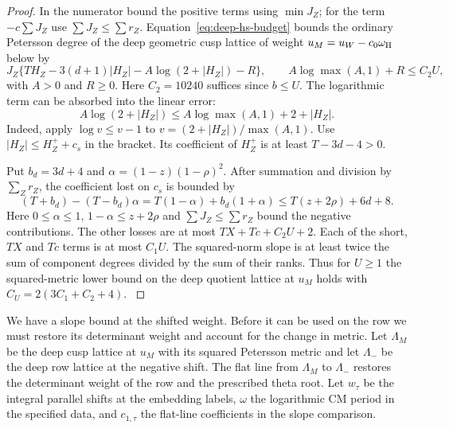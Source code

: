 \begin{proof}
In the numerator
bound the positive terms using \(\min J_Z\); for the term
\(-c\sum J_Z\) use \(\sum J_Z\le\sum r_Z\).
Equation~\eqref{eq:deep-hs-budget} bounds the ordinary
Petersson degree of the deep geometric cusp lattice of
weight \(u_M=u_W-c_0\omega_{\rm H}\) below by
\[
 J_Z\{T H_Z-3(d+1)|H_Z|-A\log(2+|H_Z|)-R\},
 \qquad A\log\max(A,1)+R\le C_2 U ,
\]
with \(A>0\) and \(R\ge0\).
Here \(C_2=10240\) suffices since \(b\le U\).
The logarithmic term can be absorbed into the linear error:
\[
 A\log(2+|H_Z|)\le A\log\max(A,1)+2+|H_Z| .
\]
Indeed, apply \(\log v\le v-1\) to \(v=(2+|H_Z|)/\max(A,1)\).
Use \(|H_Z|\le H_Z^++c_s\) in the bracket. Its coefficient
of \(H_Z^+\) is at least \(T-3d-4>0\).

Put \(b_d=3d+4\) and \(\alpha=(1-z)(1-\rho)^2\).
After summation and division by \(\sum_Z r_Z\), the coefficient
lost on \(c_s\) is bounded by
\[
 (T+b_d)-(T-b_d)\alpha
      = T(1-\alpha)+b_d(1+\alpha)
      \le T(z+2\rho)+6d+8 .
\]
Here \(0\le\alpha\le1\), \(1-\alpha\le z+2\rho\) and
\(\sum J_Z\le\sum r_Z\) bound the negative contributions.
The other losses are at most \(TX+Tc+C_2U+2\).
Each of the short, \(TX\) and \(Tc\) terms is at most
\(C_1U\). The squared-norm slope is at least twice the sum
of component degrees divided by the sum of their ranks.
Thus for \(U\ge1\) the squared-metric lower bound on the
deep quotient lattice at \(u_M\) holds
with \(C_U=2(3C_1+C_2+4)\). \label{cor:covolume-component-transfer-9}

\end{proof}

We have a slope bound at the shifted weight. Before it can be used on the row we must
restore its determinant weight and account for the change in metric. Let
\(\Lambda_M\) be the deep cusp lattice at \(u_M\) with
its squared Petersson metric and let \(\Lambda_-\) be the
deep row lattice at the negative shift. The flat line
from \(\Lambda_M\) to \(\Lambda_-\) restores the determinant weight of the row
and the prescribed theta root. Let
\(w_\tau\) be the integral parallel shifts at the embedding labels, \(\omega\) the
logarithmic CM period in the specified data, and \(c_{1,\tau}\) the
flat-line coefficients in the slope comparison.



